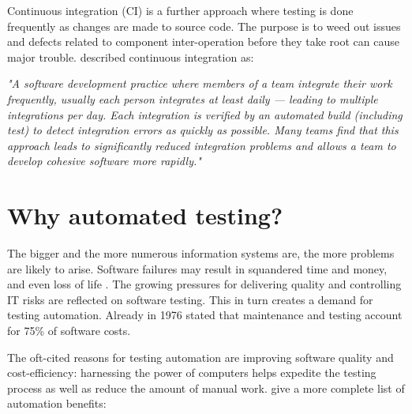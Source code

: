 \documentclass[12pt,a4paper,oneside,pdftex]{report}
\begin{document}
Continuous integration (CI) is a further approach where testing is done frequently as changes are made to source code. The purpose is to weed out issues and defects related to component inter-operation before they take root can cause major trouble. \citet{duvall2007continuous} described continuous integration as:

\begin{adjustwidth}{2.5em}{0pt}
\small
\emph{"A software development practice where members of a team integrate their work frequently, usually each person integrates at least daily --- leading to multiple integrations per day. Each integration is verified by an automated build (including test) to detect integration errors as quickly as possible. Many teams find that this approach leads to significantly reduced integration problems and allows a team to develop cohesive software more rapidly."}
\normal
\end{adjustwidth}


\section{Why automated testing?}


The bigger and the more numerous information systems are, the more problems are likely to arise. Software failures may result in squandered time and money, and even loss of life \citep{leveson1993investigation, defense1992software}. The growing pressures for delivering quality and controlling IT risks are reflected on software testing. This in turn creates a demand for testing automation. Already in 1976 \citet{myers1976software} stated that maintenance and testing account for 75\% of software costs.

The oft-cited reasons for testing automation are improving software quality and cost-efficiency: harnessing the power of computers helps expedite the testing process as well as reduce the amount of manual work. \citet{fewster1999software} give a more complete list of automation benefits:
\end{document}
